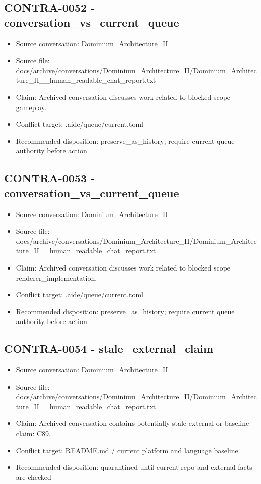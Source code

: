 \documentclass[11pt,a4paper]{report}
\begin{document}
\subsection{CONTRA-0052 - conversation\_vs\_current\_queue}

\begin{itemize}
\item Source conversation: Dominium\_Architecture\_II
\item Source file: docs/archive/conversations/Dominium\_Architecture\_II/Dominium\_Architecture\_II\_\_human\_readable\_chat\_report.txt
\item Claim: Archived conversation discusses work related to blocked scope gameplay.
\item Conflict target: .aide/queue/current.toml
\item Recommended disposition: preserve\_as\_history; require current queue authority before action
\end{itemize}

\subsection{CONTRA-0053 - conversation\_vs\_current\_queue}

\begin{itemize}
\item Source conversation: Dominium\_Architecture\_II
\item Source file: docs/archive/conversations/Dominium\_Architecture\_II/Dominium\_Architecture\_II\_\_human\_readable\_chat\_report.txt
\item Claim: Archived conversation discusses work related to blocked scope renderer\_implementation.
\item Conflict target: .aide/queue/current.toml
\item Recommended disposition: preserve\_as\_history; require current queue authority before action
\end{itemize}

\subsection{CONTRA-0054 - stale\_external\_claim}

\begin{itemize}
\item Source conversation: Dominium\_Architecture\_II
\item Source file: docs/archive/conversations/Dominium\_Architecture\_II/Dominium\_Architecture\_II\_\_human\_readable\_chat\_report.txt
\item Claim: Archived conversation contains potentially stale external or baseline claim: C89.
\item Conflict target: README.md / current platform and language baseline
\item Recommended disposition: quarantined until current repo and external facts are checked
\end{itemize}
\end{document}
